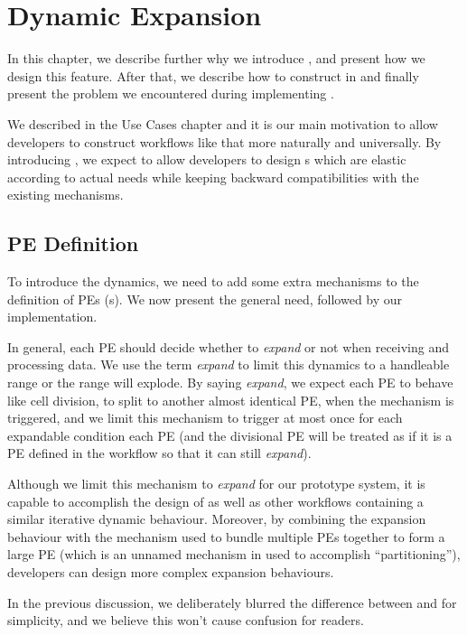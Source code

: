 \chapter{Dynamic Expansion}
In this chapter, we describe further why we introduce \tdynexp, and present how we design this feature. After that, we describe how to construct \ttsieve in \tdynexp and finally present the problem we encountered during implementing \tdynexp.

We described \ttsieve in the Use Cases chapter and it is our main motivation to allow developers to construct workflows like that more naturally and universally. By introducing \tdynexp, we expect to allow developers to design \tPETmpl{}s which are elastic according to actual needs while keeping backward compatibilities with the existing \dpy mechanisms.

\section{PE Definition} \label{sec:dynexp_PE_def}
To introduce the dynamics, we need to add some extra mechanisms to the definition of PEs (\ie \tPETmpl{}s). We now present the general need, followed by our implementation.

In general, each PE should decide whether to \textit{expand} or not when receiving and processing data. We use the term \textit{expand} to limit this dynamics to a handleable range or the range will explode. By saying \textit{expand}, we expect each PE to behave like cell division, to split to another almost identical PE, when the mechanism is triggered, and we limit this mechanism to trigger at most once for each expandable condition each PE (and the divisional PE will be treated as if it is a PE defined in the workflow so that it can still \textit{expand}).

Although we limit this mechanism to \textit{expand} for our prototype system, it is capable to accomplish the design of \ttsieve as well as other workflows containing a similar iterative dynamic behaviour. Moreover, by combining the expansion behaviour with the mechanism used to bundle multiple PEs together to form a large PE (which is an unnamed mechanism in \dpy used to accomplish ``partitioning''), developers can design more complex expansion behaviours.

In the previous discussion, we deliberately blurred the difference between \tPETmpl and \tPEInst for simplicity, and we believe this won't cause confusion for readers.

